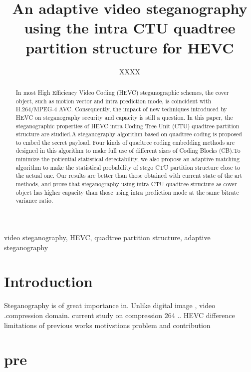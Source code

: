 \documentclass[journal,sort]{IEEEtran}
\begin{document}
\title{An adaptive video steganography using the intra CTU quadtree partition structure for HEVC}
\author{XXXX}
	

\maketitle

\begin{abstract}
In most High Efficiency Video Coding (HEVC) steganographic schemes, the cover object, such as motion vector and intra prediction mode, is coincident with H.264/MPEG-4 AVC. Consequently, the impact of new techniques introduced by HEVC on steganography security and capacity is still a question. In this paper, the steganographic properties of HEVC intra Coding Tree Unit (CTU) quadtree partition structure are studied.A steganography algorithm based on quadtree coding is proposed to embed the secret payload. Four kinds of quadtree coding embedding methods are designed in this algorithm to make full use of different sizes of Coding Blocks (CB).To minimize the potiential statistical detectability, we also propose an adaptive matching algorithm to make the statistical probability of stego CTU partition structure close to the actual one. Our results are better
than those obtained with current state of the art methods, and prove that steganography using intra CTU quadtree structure as cover object has higher capacity than those using intra prediction mode at the same bitrate variance ratio.

	
	
\end{abstract}	
\begin{IEEEkeywords}
		video steganography, HEVC, quadtree partition structure, adaptive steganography
\end{IEEEkeywords}
	
\section{Introduction\label{intro}}
	
Steganography is of great importance in. Unlike digital image , video .compression domain. 
current study on compression 264 ..
HEVC difference
limitations of previous works
motivstions
problem and contribution 



\section{pre}
\end{document}
